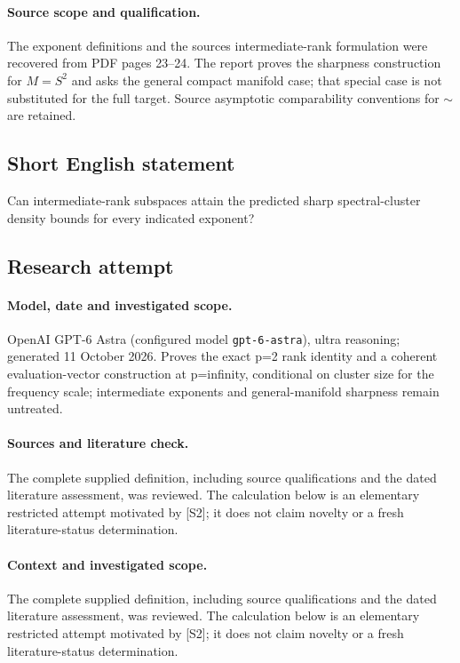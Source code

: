 \documentclass[11pt]{article}
\begin{document}
\paragraph{Source scope and qualification.}
The exponent definitions and the source\textquotesingle s intermediate-rank formulation were recovered from PDF pages 23--24. The report proves the sharpness construction for $M=S^2$ and asks the general compact manifold case; that special case is not substituted for the full target. Source asymptotic comparability conventions for $\sim$ are retained.
\subsection{Short English statement}
Can intermediate-rank subspaces attain the predicted sharp spectral-cluster density bounds for every indicated exponent?
\subsection{Research attempt}
\paragraph{Model, date and investigated scope.}
OpenAI GPT-6 Astra (configured model \texttt{gpt-6-astra}), ultra reasoning; generated 11 October 2026. Proves the exact p=2 rank identity and a coherent evaluation-vector construction at p=infinity, conditional on cluster size for the frequency scale; intermediate exponents and general-manifold sharpness remain untreated.

\paragraph{Sources and literature check.}
The complete supplied definition, including source qualifications and the dated literature assessment, was reviewed. The calculation below is an elementary restricted attempt motivated by [S2]; it does not claim novelty or a fresh literature-status determination.

\paragraph{Context and investigated scope.} The complete supplied definition, including source qualifications and the dated literature assessment, was reviewed. The calculation below is an elementary restricted attempt motivated by [S2]; it does not claim novelty or a fresh literature-status determination.
\end{document}
